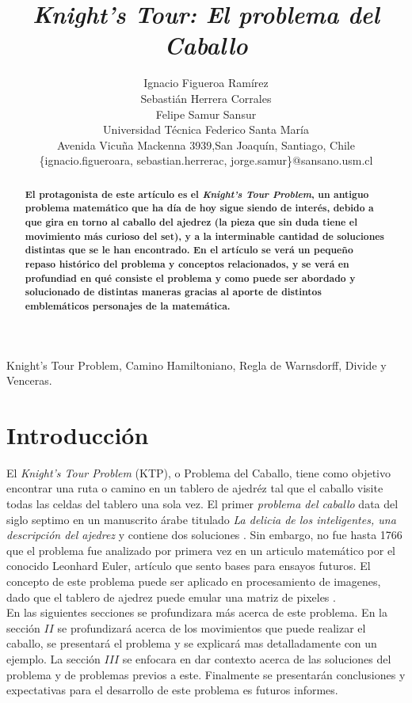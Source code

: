 \documentclass[journal, 10pt]{IEEEtran}
\begin{document}
\title{\textit{Knight's Tour:  El problema del Caballo}}
\author{Ignacio Figueroa Ram\'irez \\Sebasti\'an Herrera Corrales\\ Felipe Samur Sansur\\ Universidad T\'ecnica Federico Santa Mar\'ia \\ Avenida Vicu\~na Mackenna 3939,San Joaqu\'in, Santiago, Chile \\
\{ignacio.figueroara, sebastian.herrerac, jorge.samur\}@sansano.usm.cl}
\maketitle

\begin{abstract}
\textbf{El protagonista de este art\'iculo es el \textit{Knight's Tour Problem}, un antiguo problema matemático que ha día de hoy sigue siendo de interés, debido a que gira en torno al caballo del ajedrez (la pieza que sin duda tiene el movimiento más curioso del set), y a la interminable cantidad de soluciones distintas que se le han encontrado. En el artículo se verá un pequeño repaso histórico del problema y conceptos relacionados, y se verá en profundiad en qué consiste el problema y como puede ser abordado y solucionado de distintas maneras gracias al aporte de distintos emblemáticos personajes de la matemática. }
\end{abstract}

\begin{IEEEkeywords}
Knight's Tour Problem, Camino Hamiltoniano, Regla de Warnsdorff, Divide y Venceras.
\end{IEEEkeywords}

\section{Introducci\'on}
El \textit{Knight's Tour Problem} (KTP), o Problema del Caballo, tiene como objetivo encontrar una ruta o camino en un tablero de ajedr\'ez tal que el caballo visite todas las celdas del tablero una sola vez.
El primer \textit{problema del caballo} data del siglo septimo en un manuscrito \'arabe titulado \textit{La delicia de los inteligentes, una descripci\'on del ajedrez} y contiene dos soluciones \cite{Murray:1913}. Sin embargo, no fue hasta 1766 que el problema fue analizado por primera vez en un articulo matem\'atico \cite{Euler:1759} por el conocido Leonhard Euler, art\'iculo que sento bases para ensayos futuros. El concepto de este problema puede ser aplicado en procesamiento de imagenes, dado que el tablero de ajedrez puede emular una matriz de pixeles \cite{Xiaoyong:2017}.\\
En las siguientes secciones se profundizara m\'as acerca de este problema. En la secci\'on $II$ se profundizar\'a acerca de los movimientos que puede realizar el caballo, se presentar\'a el problema y se explicar\'a mas detalladamente con un ejemplo. La secci\'on $III$ se enfocara en dar contexto acerca de las soluciones del problema y de problemas previos a este. Finalmente se presentar\'an conclusiones y expectativas para el desarrollo de este problema es futuros informes.
\end{document}

